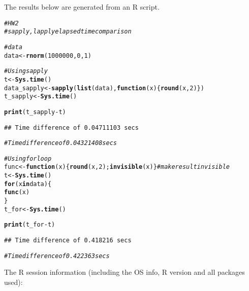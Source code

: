 \documentclass{article}\usepackage[]{graphicx}\usepackage[]{xcolor}
\makeatletter
\newcommand{\hlnum}[1]{\textcolor[rgb]{0.686,0.059,0.569}{#1}}%
\newcommand{\hlcom}[1]{\textcolor[rgb]{0.678,0.584,0.686}{\textit{#1}}}%
\newcommand{\hlopt}[1]{\textcolor[rgb]{0,0,0}{#1}}%
\newcommand{\hlstd}[1]{\textcolor[rgb]{0.345,0.345,0.345}{#1}}%
\newcommand{\hlkwa}[1]{\textcolor[rgb]{0.161,0.373,0.58}{\textbf{#1}}}%
\newcommand{\hlkwb}[1]{\textcolor[rgb]{0.69,0.353,0.396}{#1}}%
\newcommand{\hlkwc}[1]{\textcolor[rgb]{0.333,0.667,0.333}{#1}}%
\newcommand{\hlkwd}[1]{\textcolor[rgb]{0.737,0.353,0.396}{\textbf{#1}}}%
\newenvironment{kframe}{%
 \def\at@end@of@kframe{}%
 \ifinner\ifhmode%
  \def\at@end@of@kframe{\end{minipage}}%
  \begin{minipage}{\columnwidth}%
 \fi\fi%
 \def\FrameCommand##1{\hskip\@totalleftmargin \hskip-\fboxsep
 \colorbox{shadecolor}{##1}\hskip-\fboxsep
     \hskip-\linewidth \hskip-\@totalleftmargin \hskip\columnwidth}%
 \MakeFramed {\advance\hsize-\width
   \@totalleftmargin\z@ \linewidth\hsize
   \@setminipage}}%
 {\par\unskip\endMakeFramed%
 \at@end@of@kframe}
\newenvironment{knitrout}{}{} %
\makeatother
\begin{document}
The results below are generated from an R script.

\begin{knitrout}
\color{fgcolor}\begin{kframe}
\begin{alltt}
\hlcom{# HW2}
\hlcom{# sapply, lapply elapsed time comparison}

\hlcom{# data}
\hlstd{data} \hlkwb{<-} \hlkwd{rnorm}\hlstd{(}\hlnum{1000000}\hlstd{,} \hlnum{0}\hlstd{,} \hlnum{1}\hlstd{)}

\hlcom{# Using sapply}
\hlstd{t} \hlkwb{<-} \hlkwd{Sys.time}\hlstd{()}
\hlstd{data_sapply} \hlkwb{<-} \hlkwd{sapply}\hlstd{(}\hlkwd{list}\hlstd{(data),} \hlkwa{function}\hlstd{(}\hlkwc{x}\hlstd{)\{}\hlkwd{round}\hlstd{(x,}\hlnum{2}\hlstd{)\})}
\hlstd{t_sapply} \hlkwb{<-} \hlkwd{Sys.time}\hlstd{()}

\hlkwd{print}\hlstd{(t_sapply} \hlopt{-} \hlstd{t)}
\end{alltt}
\begin{verbatim}
## Time difference of 0.04711103 secs
\end{verbatim}
\begin{alltt}
\hlcom{# Time difference of 0.04321408 secs}

\hlcom{# Using for loop}
\hlstd{func} \hlkwb{<-} \hlkwa{function}\hlstd{(}\hlkwc{x}\hlstd{)\{}\hlkwd{round}\hlstd{(x,}\hlnum{2}\hlstd{) ;} \hlkwd{invisible}\hlstd{(x)\}} \hlcom{# make result invisible}
\hlstd{t} \hlkwb{<-} \hlkwd{Sys.time}\hlstd{()}
\hlkwa{for} \hlstd{(x} \hlkwa{in} \hlstd{data) \{}
  \hlkwd{func}\hlstd{(x)}
\hlstd{\}}
\hlstd{t_for} \hlkwb{<-} \hlkwd{Sys.time}\hlstd{()}

\hlkwd{print}\hlstd{(t_for} \hlopt{-} \hlstd{t)}
\end{alltt}
\begin{verbatim}
## Time difference of 0.418216 secs
\end{verbatim}
\begin{alltt}
\hlcom{# Time difference of 0.422363 secs}
\end{alltt}
\end{kframe}
\end{knitrout}

The R session information (including the OS info, R version and all
packages used):
\end{document}
